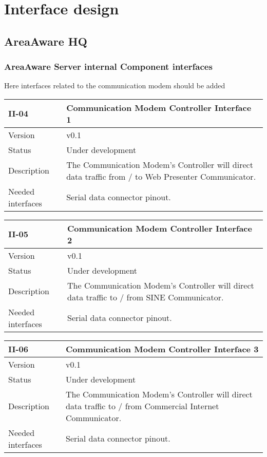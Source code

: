 \chapter{Interface design}
\label{chp_interfaceDesign}

\section{AreaAware HQ}
\label{sec:areaAwarehq}
\subsection{AreaAware Server internal Component interfaces}
Here interfaces related to the communication modem should be added

\begin{longtable}{| p{3.5cm} |  p{10cm} | }
	\hline
	\textbf{II-04} &  \textbf{Communication Modem Controller Interface 1} \\
	\hline
	Version & v0.1 \\
	\hline
	Status & Under development \\
	\hline
	Description & The Communication Modem's Controller will direct data traffic from / to Web Presenter Communicator.
	\\
	\hline
	Needed interfaces 
	& Serial data connector pinout. \\
	\hline
\end{longtable}

\begin{longtable}{| p{3.5cm} |  p{10cm} | }
	\hline
	\textbf{II-05} &  \textbf{Communication Modem Controller Interface 2} \\
	\hline
	Version & v0.1 \\
	\hline
	Status & Under development \\
	\hline
	Description & The Communication Modem's Controller will direct data traffic to / from SINE Communicator.
	\\
	\hline
	Needed interfaces 
	& Serial data connector pinout. \\
	\hline
\end{longtable}

\begin{longtable}{| p{3.5cm} |  p{10cm} | }
	\hline
	\textbf{II-06} &  \textbf{Communication Modem Controller Interface 3} \\
	\hline
	Version & v0.1 \\
	\hline
	Status & Under development \\
	\hline
	Description & The Communication Modem's Controller will direct data traffic to / from Commercial Internet Communicator.
	\\
	\hline
	Needed interfaces 
	& Serial data connector pinout. \\
	\hline
\end{longtable}


